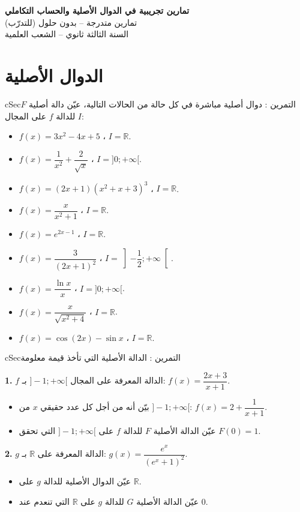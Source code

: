 \documentclass[12pt,a4paper]{article}
\newenvironment{BOX}[2]{\begin{otherlanguage}{english}\begin{arbox}{#1}{#2}}{\end{arbox}\end{otherlanguage}}
\newcounter{exo}
\newenvironment{tamrin}[1]{\stepcounter{exo}\begin{BOX}{cSec}{التمرين \theexo: #1}}{\end{BOX}}
\newenvironment{LTR}{\begin{otherlanguage}{english}}{\end{otherlanguage}}
\newcommand{\R}{\mathbb{R}}
\newenvironment{sq}{\begin{itemize}[leftmargin=2.4em,itemsep=3pt]}{\end{itemize}}
\newcommand{\qa}{\item[(أ)]}\newcommand{\qb}{\item[(ب)]}\newcommand{\qc}{\item[(جـ)]}\newcommand{\qd}{\item[(د)]}\newcommand{\qe}{\item[(هـ)]}
\newcommand{\QQ}[1]{\par\smallskip\textbf{#1.} }
\begin{document}
\begin{LTR}
\begin{tcolorbox}[enhanced,colback=cSec,colframe=cSec,arc=3mm,halign=center,boxrule=0pt,top=12pt,bottom=12pt,before upper={\selectlanguage{arabic}}]
{\color{white}\fontsize{24}{30}\selectfont\bfseries تمارين تجريبية في الدوال الأصلية والحساب التكاملي}\\[8pt]
{\color{white}\large تمارين متدرجة -- بدون حلول (للتدرّب)}\\[5pt]
{\color{white}\large السنة الثالثة ثانوي -- الشعب العلمية}
\end{tcolorbox}
\end{LTR}
\section{الدوال الأصلية}

\begin{tamrin}{دوال أصلية مباشرة}
في كل حالة من الحالات التالية، عيّن دالة أصلية $F$ للدالة $f$ على المجال $I$:
\begin{sq}
\qa $f(x)=3x^{2}-4x+5$ \quad ، \quad $I=\R$.
\qb $f(x)=\dfrac{1}{x^{2}}+\dfrac{2}{\sqrt{x}}$ \quad ، \quad $I=]0;+\infty[$.
\qc $f(x)=(2x+1)\left(x^{2}+x+3\right)^{3}$ \quad ، \quad $I=\R$.
\qd $f(x)=\dfrac{x}{x^{2}+1}$ \quad ، \quad $I=\R$.
\qe $f(x)=e^{2x-1}$ \quad ، \quad $I=\R$.
\item[(و)] $f(x)=\dfrac{3}{(2x+1)^{2}}$ \quad ، \quad $I=\left]-\dfrac12;+\infty\right[$.
\item[(ز)] $f(x)=\dfrac{\ln x}{x}$ \quad ، \quad $I=]0;+\infty[$.
\item[(ح)] $f(x)=\dfrac{x}{\sqrt{x^{2}+4}}$ \quad ، \quad $I=\R$.
\item[(ط)] $f(x)=\cos(2x)-\sin x$ \quad ، \quad $I=\R$.
\end{sq}
\end{tamrin}

\begin{tamrin}{الدالة الأصلية التي تأخذ قيمة معلومة}
\QQ{1} $f$ الدالة المعرفة على المجال $]-1;+\infty[$ بـ: $f(x)=\dfrac{2x+3}{x+1}$.
\begin{sq}
\qa بيّن أنه من أجل كل عدد حقيقي $x$ من $]-1;+\infty[$: $f(x)=2+\dfrac{1}{x+1}$.
\qb عيّن الدالة الأصلية $F$ للدالة $f$ على $]-1;+\infty[$ التي تحقق $F(0)=1$.
\end{sq}
\QQ{2} $g$ الدالة المعرفة على $\R$ بـ: $g(x)=\dfrac{e^{x}}{\left(e^{x}+1\right)^{2}}$.
\begin{sq}
\qa عيّن الدوال الأصلية للدالة $g$ على $\R$.
\qb عيّن الدالة الأصلية $G$ للدالة $g$ على $\R$ التي تنعدم عند $0$.
\end{sq}
\end{tamrin}
\end{document}
